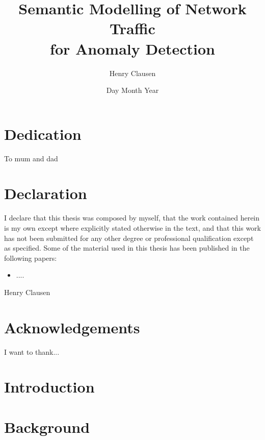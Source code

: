 \documentclass[a4paper,12pt,twoside]{report}
\title{
{Semantic Modelling of Network Traffic\\ for Anomaly Detection}\\
}
\author{Henry Clausen}
\date{Day Month Year}
\begin{document}




\chapter*{Dedication}
To mum and dad

\chapter*{Declaration}

I declare that this thesis was composed by myself, that the work contained herein is my own except where explicitly stated otherwise in the text, and that this work has not been submitted for any other degree or professional qualification except as specified. Some of the material used in this thesis has been published in the following papers:

\begin{itemize}
\item ....
\end{itemize}

\hspace*{0pt}\hfill Henry Clausen

\chapter*{Acknowledgements}
I want to thank...

\tableofcontents

\chapter{Introduction}


\chapter{Background}


%
\end{document}
